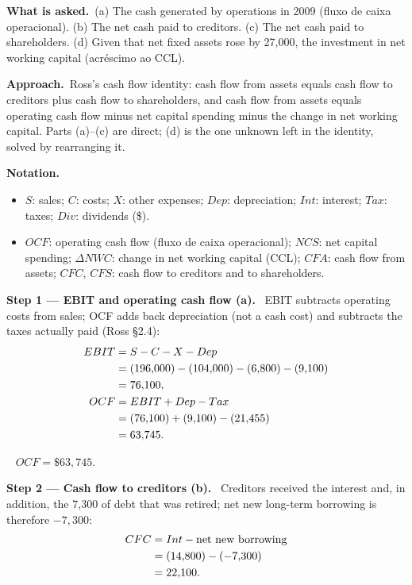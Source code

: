 \documentclass[11pt,a4paper]{article}
\newcommand{\notation}{\par\noindent\textbf{Notation.}}
\newcommand{\step}[2]{\par\medskip\noindent\textbf{Step #1 --- #2.}~}
\newcommand{\pt}{\foreignlanguage{brazilian}}
\newcommand{\asked}{\par\medskip\noindent\textbf{What is asked.}~}
\newcommand{\approach}{\par\smallskip\noindent\textbf{Approach.}~}
\newcommand{\answer}[1]{\par\smallskip\noindent\fbox{\textbf{Answer #1.}}~}
\begin{document}
\asked (a) The cash generated by operations in 2009 (\pt{fluxo de caixa operacional}). (b) The net
cash paid to creditors. (c) The net cash paid to shareholders. (d) Given that net fixed assets rose
by 27,000, the investment in net working capital (\pt{acr\'escimo ao CCL}).

\approach Ross's cash flow identity: cash flow from assets equals cash flow to creditors plus cash
flow to shareholders, and cash flow from assets equals operating cash flow minus net capital
spending minus the change in net working capital. Parts (a)--(c) are direct; (d) is the one unknown
left in the identity, solved by rearranging it.

\notation
\begin{itemize}
  \item $S$: sales; $C$: costs; $X$: other expenses; $Dep$: depreciation; $Int$: interest; $Tax$:
        taxes; $Div$: dividends (\$).
  \item $OCF$: operating cash flow (\pt{fluxo de caixa operacional}); $NCS$: net capital spending;
        $\Delta NWC$: change in net working capital (\pt{CCL}); $CFA$: cash flow from assets;
        $CFC$, $CFS$: cash flow to creditors and to shareholders.
\end{itemize}

\step{1}{EBIT and operating cash flow (a)}
EBIT subtracts operating costs from sales; OCF adds back depreciation (not a cash cost) and
subtracts the taxes actually paid (Ross \S2.4):
\begin{align}
  EBIT &= S - C - X - Dep \notag\\
  &= (196{,}000) - (104{,}000) - (6{,}800) - (9{,}100) \notag\\
  &= 76{,}100, \label{e9-ebit}\\
  OCF &= EBIT + Dep - Tax \label{e9-ocfdef}\\
  &= (76{,}100) + (9{,}100) - (21{,}455) \notag\\
  &= 63{,}745. \label{e9-ocf}
\end{align}

\answer{(a)} $OCF = \$63{,}745$.

\step{2}{Cash flow to creditors (b)}
Creditors received the interest and, in addition, the 7,300 of debt that was retired; net new
long-term borrowing is therefore $-7{,}300$:
\begin{align}
  CFC &= Int - \text{net new borrowing} \label{e9-cfcdef}\\
  &= (14{,}800) - (-7{,}300) \notag\\
  &= 22{,}100. \label{e9-cfc}
\end{align}
\end{document}
